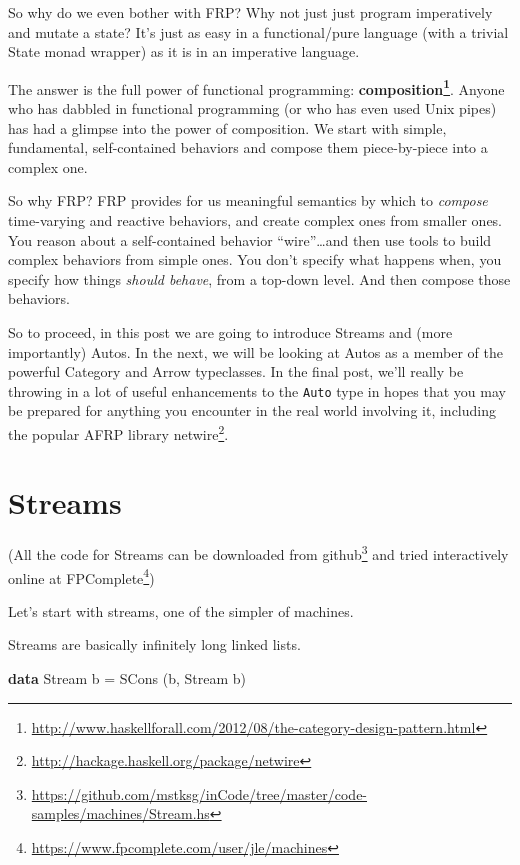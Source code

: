 \documentclass[]{article}
\newenvironment{Shaded}{}{}
\newcommand{\DataTypeTok}[1]{\textcolor[rgb]{0.56,0.13,0.00}{#1}}
\newcommand{\KeywordTok}[1]{\textcolor[rgb]{0.00,0.44,0.13}{\textbf{#1}}}
\newcommand{\NormalTok}[1]{#1}
\newcommand{\OtherTok}[1]{\textcolor[rgb]{0.00,0.44,0.13}{#1}}
\renewcommand{\href}[2]{#2\footnote{\url{#1}}}
\begin{document}
So why do we even bother with FRP? Why not just just program imperatively and
mutate a state? It's just as easy in a functional/pure language (with a trivial
State monad wrapper) as it is in an imperative language.

The answer is the full power of functional programming:
\textbf{\href{http://www.haskellforall.com/2012/08/the-category-design-pattern.html}{composition}}.
Anyone who has dabbled in functional programming (or who has even used Unix
pipes) has had a glimpse into the power of composition. We start with simple,
fundamental, self-contained behaviors and compose them piece-by-piece into a
complex one.

So why FRP? FRP provides for us meaningful semantics by which to \emph{compose}
time-varying and reactive behaviors, and create complex ones from smaller ones.
You reason about a self-contained behavior ``wire''\ldots and then use tools to
build complex behaviors from simple ones. You don't specify what happens when,
you specify how things \emph{should behave}, from a top-down level. And then
compose those behaviors.

So to proceed, in this post we are going to introduce Streams and (more
importantly) Autos. In the next, we will be looking at Autos as a member of the
powerful Category and Arrow typeclasses. In the final post, we'll really be
throwing in a lot of useful enhancements to the \texttt{Auto} type in hopes that
you may be prepared for anything you encounter in the real world involving it,
including the popular AFRP library
\href{http://hackage.haskell.org/package/netwire}{netwire}.

\section{Streams}\label{streams}

(All the code for Streams can be downloaded
\href{https://github.com/mstksg/inCode/tree/master/code-samples/machines/Stream.hs}{from
github} and tried interactively online
\href{https://www.fpcomplete.com/user/jle/machines}{at FPComplete})

Let's start with streams, one of the simpler of machines.

Streams are basically infinitely long linked lists.

\begin{Shaded}
\begin{Highlighting}[]
\KeywordTok{data} \DataTypeTok{Stream}\NormalTok{ b }\OtherTok{=} \DataTypeTok{SCons}\NormalTok{ (b, }\DataTypeTok{Stream}\NormalTok{ b)}
\end{Highlighting}
\end{Shaded}
\end{document}
